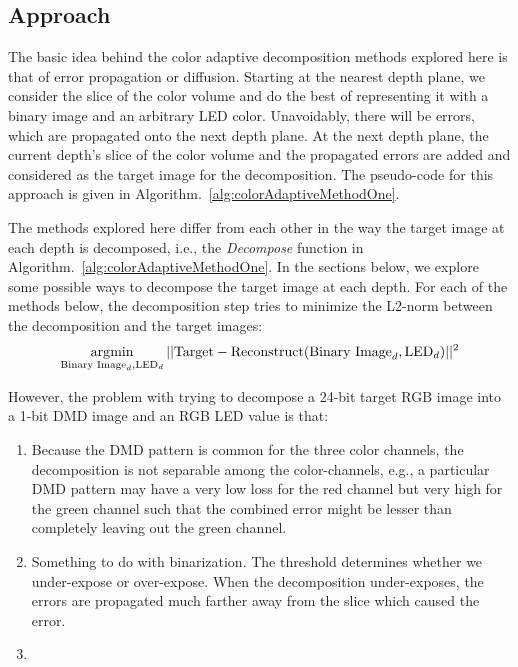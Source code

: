 \subsection{Approach}
The basic idea behind the color adaptive decomposition methods explored here is that of error propagation or diffusion. 
Starting at the nearest depth plane, we consider the slice of the color volume and do the best of representing it with a binary image and an arbitrary LED color. 
Unavoidably, there will be errors, which are propagated onto the next depth plane. 
At the next depth plane, the current depth's slice of the color volume and the propagated errors are added and considered as the target image for the decomposition.
The pseudo-code for this approach is given in Algorithm.~\ref{alg:colorAdaptiveMethodOne}. 


The methods explored here differ from each other in the way the target image at each depth is decomposed, i.e., the \emph{Decompose} function in Algorithm.~\ref{alg:colorAdaptiveMethodOne}.
In the sections below, we explore some possible ways to decompose the target image at each depth.
For each of the methods below, the decomposition step tries to minimize the L2-norm between the decomposition and the target images:
\begin{equation}
    \operatorname*{arg\!\min}_{\text{Binary Image}_d,\text{LED}_d} ||\text{Target} - \text{Reconstruct}(\text{Binary Image}_d, \text{LED}_d) ||^2
\end{equation}

However, the problem with trying to decompose a 24-bit target RGB image into a 1-bit DMD image and an RGB LED value is that:
\begin{enumerate}
    \item Because the DMD pattern is common for the three color channels, the decomposition is not separable among the color-channels, e.g., a particular DMD pattern may have a very low loss for the red channel but very high for the green channel such that the combined error might be lesser than completely leaving out the green channel. 
    \item Something to do with binarization. The threshold determines whether we under-expose or over-expose. When the decomposition under-exposes, the errors are propagated much farther away from the slice which caused the error.
    \item 
\end{enumerate}

